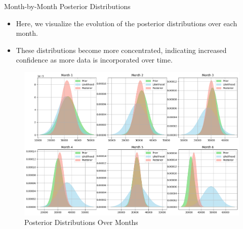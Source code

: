 \begin{frame}{Month-by-Month Posterior Distributions}

  \begin{itemize}
    \item Here, we visualize the evolution of the posterior distributions over each month.
    \item These distributions become more concentrated, indicating increased confidence as more data is incorporated over time.
  \end{itemize}

\begin{figure}
  \centering
  \includegraphics[width=.6\linewidth]{../Report/images/months.png}
  \caption{Posterior Distributions Over Months}
\end{figure}

  
\end{frame}
